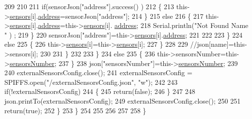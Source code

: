 \begin{DoxyCode}
209 
210                     
211                         \textcolor{keywordflow}{if}(sensorJson[\textcolor{stringliteral}{"address"}].success() )
212                         \{                   
213                             this->\hyperlink{classExternalSensors_a284233f884fcf00154a44740cf1d9e1e}{sensors}[i].\hyperlink{structExternalSensors_1_1sensor_a8d70ca58524521ed054fc6b81eb58d34}{address}=sensorJson[\textcolor{stringliteral}{"address"}];
214                         \}
215                         \textcolor{keywordflow}{else}
216                         \{   
217                             this->\hyperlink{classExternalSensors_a284233f884fcf00154a44740cf1d9e1e}{sensors}[i].\hyperlink{structExternalSensors_1_1sensor_a8d70ca58524521ed054fc6b81eb58d34}{address}=this->\hyperlink{classExternalSensors_a284233f884fcf00154a44740cf1d9e1e}{sensors}[i].
      \hyperlink{structExternalSensors_1_1sensor_a8d70ca58524521ed054fc6b81eb58d34}{address};
218                             Serial.println(\textcolor{stringliteral}{"Not Found Name "} ) ;                        
219                         \}
220                         sensorJson[\textcolor{stringliteral}{"address"}]=this->\hyperlink{classExternalSensors_a284233f884fcf00154a44740cf1d9e1e}{sensors}[i].\hyperlink{structExternalSensors_1_1sensor_a8d70ca58524521ed054fc6b81eb58d34}{address};
221                     
222     
223                     \}
224                     \textcolor{keywordflow}{else}
225                     \{
226                         this->\hyperlink{classExternalSensors_a284233f884fcf00154a44740cf1d9e1e}{sensors}[i]=this->\hyperlink{classExternalSensors_a284233f884fcf00154a44740cf1d9e1e}{sensors}[i];                    
227                     \}
228                                             
229                     \textcolor{comment}{//json[name]=this->sensors[i];                  }
230 
231                 \}
232  
233             \}
234             \textcolor{keywordflow}{else}
235             \{
236                 this->sensorsNumber=this->\hyperlink{classExternalSensors_a58e4fbf9adeae787d92be5fa33043b5d}{sensorsNumber};
237             \}
238             json[\textcolor{stringliteral}{"sensorsNumber"}]=this->\hyperlink{classExternalSensors_a58e4fbf9adeae787d92be5fa33043b5d}{sensorsNumber};
239 
240             externalSensorsConfig.close();
241             externalSensorsConfig = SPIFFS.open(\textcolor{stringliteral}{"/externalSensorsConfig.json"}, \textcolor{stringliteral}{"w"});
242 
243             \textcolor{keywordflow}{if}(!externalSensorsConfig)
244             \{
245                 \textcolor{keywordflow}{return}(\textcolor{keyword}{false});
246             \}
247             
248             json.printTo(externalSensorsConfig);
249             externalSensorsConfig.close();
250             
251             \textcolor{keywordflow}{return}(\textcolor{keyword}{true}); 
252         \}
253     \}   
254     
255 
256 
257 
258 \}
\end{DoxyCode}
